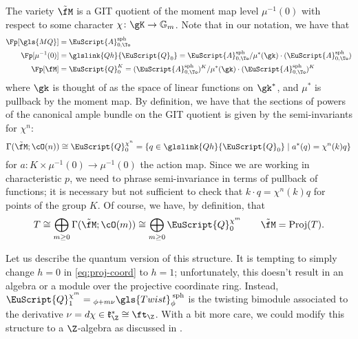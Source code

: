 The variety $\tilde{\fM}$ is a GIT quotient of the moment map level $\mu^{-1}(0)$ with respect to some character $\chi\colon \gK\to \mathbb{G}_m$. Note that in our notation, we have that 
  \begin{align*}
    \Fp[\gls{MQ}]&=\EuScript{A}_{0,\To}^{\operatorname{sph}}\\
    \Fp[\mu^{-1}(0)]&=\glslink{Qh}{\EuScript{Q}_0}=\EuScript{A}_{0,\To}^{\operatorname{sph}}/\mu^*(\gk)\cdot(\EuScript{A}_{0,\To}^{\operatorname{sph}})\\
    \Fp[\fM]&=\EuScript{Q}_0^K= (\EuScript{A}_{0,\To}^{\operatorname{sph}})^K/\mu^*(\gk)\cdot(\EuScript{A}_{0,\To}^{\operatorname{sph}})^K
  \end{align*}
  where $\gk$ is thought of as the space of linear functions on $\gk^*$, and $\mu^*$ is pullback by the moment map.    
  By definition, we have that the sections of powers of the canonical ample bundle on the GIT quotient is given by the semi-invariants for $\chi^n$:
  \begin{equation*}
    \Gamma(\tilde{\fM};\cO(n))\cong \EuScript{Q}_0^{\chi^n} =\{q\in \glslink{Qh}{\EuScript{Q}_0}\mid a^*( q)=\chi^n(k)q \} 
  \end{equation*}
  for $a\colon K\times \mu^{-1}(0)\to \mu^{-1}(0) $ the action map. Since we are working in characteristic $p$, we need to phrase semi-invariance in terms of pullback of functions; it is necessary but not sufficient to check that $k\cdot q=\chi^n(k)q$ for points of the group $K$.  Of course, we have, by definition, that
  \begin{equation}
T\cong \bigoplus_{m\geq 0}\Gamma(\tilde{\fM};\cO(m))\cong \bigoplus_{m\geq 0}\EuScript{Q}_0^{\chi^m}\qquad \tilde{\fM}=\operatorname{Proj}(T).\label{eq:proj-coord}
\end{equation}

  Let us describe the quantum version of this structure.  It is tempting to simply change $h=0$ in \eqref{eq:proj-coord} to $h=1$; unfortunately, this doesn't result in an algebra
  or a module over the projective coordinate ring.  Instead, $\EuScript{Q}_1^{\chi^m}={}_{\phi+m\nu}\gls{Twist}^{\:\operatorname{sph}}_\phi$ is the twisting bimodule associated to the derivative $\nu=d\chi\in \mathfrak{k}_\Z^*\cong \ft_\Z$.   With a bit more care, we could modify this structure to a $\Z$-algebra as discussed in \cite[\S 5.5]{BLPWquant}.

